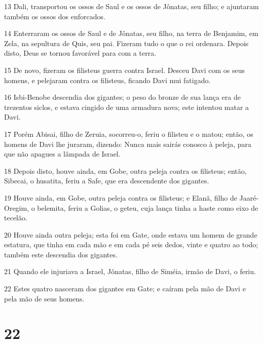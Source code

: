\par 13 Dali, transportou os ossos de Saul e os ossos de Jônatas, seu filho; e ajuntaram também os ossos dos enforcados.
\par 14 Enterraram os ossos de Saul e de Jônatas, seu filho, na terra de Benjamim, em Zela, na sepultura de Quis, seu pai. Fizeram tudo o que o rei ordenara. Depois disto, Deus se tornou favorável para com a terra.
\par 15 De novo, fizeram os filisteus guerra contra Israel. Desceu Davi com os seus homens, e pelejaram contra os filisteus, ficando Davi mui fatigado.
\par 16 Isbi-Benobe descendia dos gigantes; o peso do bronze de sua lança era de trezentos siclos, e estava cingido de uma armadura nova; este intentou matar a Davi.
\par 17 Porém Abisai, filho de Zeruia, socorreu-o, feriu o filisteu e o matou; então, os homens de Davi lhe juraram, dizendo: Nunca mais sairás conosco à peleja, para que não apagues a lâmpada de Israel.
\par 18 Depois disto, houve ainda, em Gobe, outra peleja contra os filisteus; então, Sibecai, o husatita, feriu a Safe, que era descendente dos gigantes.
\par 19 Houve ainda, em Gobe, outra peleja contra os filisteus; e Elanã, filho de Jaaré-Oregim, o belemita, feriu a Golias, o geteu, cuja lança tinha a haste como eixo de tecelão.
\par 20 Houve ainda outra peleja; esta foi em Gate, onde estava um homem de grande estatura, que tinha em cada mão e em cada pé seis dedos, vinte e quatro ao todo; também este descendia dos gigantes.
\par 21 Quando ele injuriava a Israel, Jônatas, filho de Siméia, irmão de Davi, o feriu.
\par 22 Estes quatro nasceram dos gigantes em Gate; e caíram pela mão de Davi e pela mão de seus homens.

\chapter{22}

